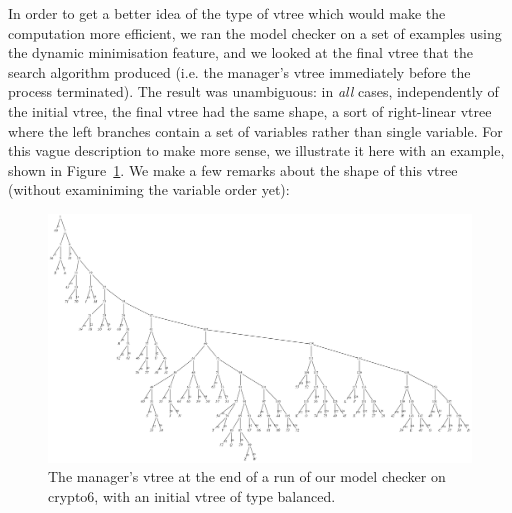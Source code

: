 \documentclass[11pt]{article}
\begin{document}
In order to get a better idea of the type of vtree which would make the computation more efficient, we ran the model checker on a set of examples using the dynamic minimisation feature, and we looked at the final vtree that the search algorithm produced (i.e. the manager's vtree immediately before the process terminated). The result was unambiguous: in \textit{all} cases, independently of the initial vtree, the final vtree had the same shape, a sort of right-linear vtree where the left branches contain a set of variables rather than single variable. For this vague description to make more sense, we illustrate it here with an example, shown in Figure~\ref{fig:large_vtree_after_reordering}. 
We make a few remarks about the shape of this vtree (without examiniming the variable order yet):
\begin{figure}
\includegraphics[scale=0.3]{largevtreeafterdao.png}
\caption{The manager's vtree at the end of a run of our model checker on crypto6, with an initial vtree of type balanced.}
\label{fig:large_vtree_after_reordering}
\end{figure}
\end{document}
